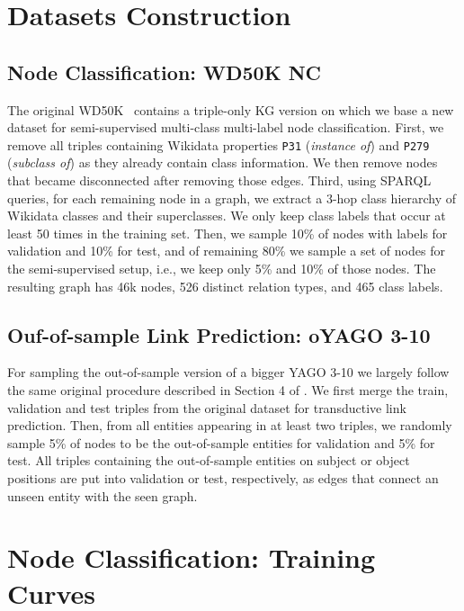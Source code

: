 \documentclass{article} \usepackage{iclr2022_conference,times}
\begin{document}
\section{Datasets Construction}
\label{app:wd50k}

\subsection{Node Classification: WD50K NC }
The original WD50K~\citep{galkin-etal-2020-message} contains a triple-only KG version on which we base a new dataset for semi-supervised multi-class multi-label node classification.
First, we remove all triples containing Wikidata properties \texttt{P31} (\emph{instance of}) and \texttt{P279} (\emph{subclass of}) as they already contain class information. 
We then remove nodes that became disconnected after removing those edges.
Third, using SPARQL queries, for each remaining node in a graph, we extract a 3-hop class hierarchy of Wikidata classes and their superclasses.
We only keep class labels that occur at least 50 times in the training set.
Then, we sample 10\% of nodes with labels for validation and 10\% for test, and of remaining 80\% we sample a set of nodes for the semi-supervised setup, i.e., we keep only 5\% and 10\% of those nodes.
The resulting graph has 46k nodes, 526 distinct relation types, and 465 class labels.

\subsection{Ouf-of-sample Link Prediction: oYAGO 3-10}

For sampling the out-of-sample version of a bigger YAGO 3-10 we largely follow the same original procedure described in Section 4 of \citep{albooyeh-etal-2020-sample}.
We first merge the train, validation and test triples from the original dataset for transductive link prediction. Then, from all entities appearing in at least two triples, we randomly sample 5\% of nodes to be the out-of-sample entities for validation and 5\% for test. 
All triples containing the out-of-sample entities on subject or object positions are put into validation or test, respectively, as edges that connect an unseen entity with the seen graph.




\section{Node Classification: Training Curves}
\label{app:nc_curves}
\end{document}
